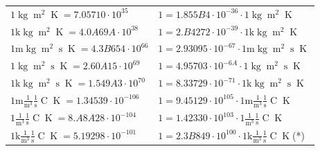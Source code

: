 \begin{center}
\begin{longtable}{l l}
{\color{black}$1 \bm{\mathrm{ }}\operatorname{kg}{\operatorname{m}^2}{}{}{\operatorname{K}} = 7.05710\cdot10^{35} $}   & {\color{black}$ 1 = 1.855B4\cdot10^{-36} \cdot 1 \bm{\mathrm{ }}\operatorname{kg}{\operatorname{m}^2}{}{}{\operatorname{K}}$}  \\
{\color{gray}$1 \bm{\mathrm{ k}}\operatorname{kg}{\operatorname{m}^2}{}{}{\operatorname{K}} = 4.0A69A\cdot10^{38} $}   & {\color{gray}$ 1 = 2.B4272\cdot10^{-39} \cdot 1 \bm{\mathrm{ k}}\operatorname{kg}{\operatorname{m}^2}{}{}{\operatorname{K}}$}  \\
{\color{gray}$1 \bm{\mathrm{ m}}\operatorname{kg}{\operatorname{m}^2}{\operatorname{s}}{}{\operatorname{K}} = 4.3B654\cdot10^{66} $}   & {\color{gray}$ 1 = 2.93095\cdot10^{-67} \cdot 1 \bm{\mathrm{ m}}\operatorname{kg}{\operatorname{m}^2}{\operatorname{s}}{}{\operatorname{K}}$}  \\
{\color{black}$1 \bm{\mathrm{ }}\operatorname{kg}{\operatorname{m}^2}{\operatorname{s}}{}{\operatorname{K}} = 2.60A15\cdot10^{69} $}   & {\color{black}$ 1 = 4.95703\cdot10^{-6A} \cdot 1 \bm{\mathrm{ }}\operatorname{kg}{\operatorname{m}^2}{\operatorname{s}}{}{\operatorname{K}}$}  \\
{\color{gray}$1 \bm{\mathrm{ k}}\operatorname{kg}{\operatorname{m}^2}{\operatorname{s}}{}{\operatorname{K}} = 1.549A3\cdot10^{70} $}   & {\color{gray}$ 1 = 8.33729\cdot10^{-71} \cdot 1 \bm{\mathrm{ k}}\operatorname{kg}{\operatorname{m}^2}{\operatorname{s}}{}{\operatorname{K}}$}  \\
\hline{\color{gray}$1 \bm{\mathrm{ m}}\frac1{\operatorname{m}^3}\frac1{\operatorname{s}}{\operatorname{C}}{\operatorname{K}} = 1.34539\cdot10^{-106} $}   & {\color{gray}$ 1 = 9.45129\cdot10^{105} \cdot 1 \bm{\mathrm{ m}}\frac1{\operatorname{m}^3}\frac1{\operatorname{s}}{\operatorname{C}}{\operatorname{K}}$}  \\
{\color{black}$1 \bm{\mathrm{ }}\frac1{\operatorname{m}^3}\frac1{\operatorname{s}}{\operatorname{C}}{\operatorname{K}} = 8.A8A28\cdot10^{-104} $}   & {\color{black}$ 1 = 1.42330\cdot10^{103} \cdot 1 \bm{\mathrm{ }}\frac1{\operatorname{m}^3}\frac1{\operatorname{s}}{\operatorname{C}}{\operatorname{K}}$}  \\
{\color{gray}$1 \bm{\mathrm{ k}}\frac1{\operatorname{m}^3}\frac1{\operatorname{s}}{\operatorname{C}}{\operatorname{K}} = 5.19298\cdot10^{-101} $}   & {\color{gray}$ 1 = 2.3B849\cdot10^{100} \cdot 1 \bm{\mathrm{ k}}\frac1{\operatorname{m}^3}\frac1{\operatorname{s}}{\operatorname{C}}{\operatorname{K}}$}\quad(*)\\

\end{longtable}
\end{center}
